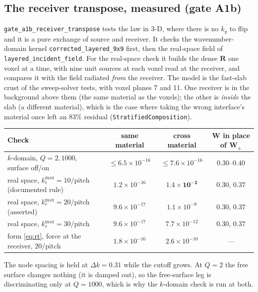 \documentclass[11pt,a4paper]{article}
\newcommand{\bW}{\mathbf{W}}
\newcommand{\bR}{\mathbf{R}}
\begin{document}
\subsection{The receiver transpose, measured (gate A1b)}\label{sec:a1b}

\nolinkurl{gate_a1b_receiver_transpose} tests the law in 3-D, where there is no $k_y$ to flip and
it is a pure exchange of source and receiver. It checks the wavenumber-domain kernel
\nolinkurl{corrected_layered_9x9} first, then the real-space field of
\nolinkurl{layered_incident_field}. For the real-space check it builds the dense $\bR$ one voxel at
a time, with nine unit sources at each voxel read at the receiver, and compares it with the field
radiated \emph{from} the receiver. The model is the fast-slab crust of the sweep-solver tests,
with voxel planes 7 and 11. One receiver is in the background above them (the same material as the
voxels); the other is \emph{inside} the slab (a different material), which is the case where
taking the wrong interface's material once left an 83\% residual (\texttt{StratifiedComposition}).

\begin{center}
\small
\setlength{\tabcolsep}{4pt}\begin{tabular}{@{}lccc@{}}
\toprule
Check & same material & cross material & $\bW$ in place of $\mathbf{W}_{\pm}$ \\
\midrule
$k$-domain, $Q=2, 1000$, surface off/on & $\le6.5\times10^{-16}$ & $\le7.6\times10^{-16}$ & $0.30$--$0.40$ \\
real space, $k_r^{\max}=10/\text{pitch}$ (documented rule) & $1.2\times10^{-16}$ & $\mathbf{1.4\times10^{-2}}$ & $0.30$, $0.37$ \\
real space, $k_r^{\max}=20/\text{pitch}$ (asserted) & $9.6\times10^{-17}$ & $1.1\times10^{-9}$ & $0.30$, $0.37$ \\
real space, $k_r^{\max}=30/\text{pitch}$ & $9.6\times10^{-17}$ & $7.7\times10^{-12}$ & $0.30$, $0.37$ \\
form \eqref{eq:rt}, force at the receiver, $20/\text{pitch}$ & $1.8\times10^{-16}$ & $2.6\times10^{-10}$ & --- \\
\bottomrule
\end{tabular}
\end{center}

The node spacing is held at $\Delta k = 0.31$ while the cutoff grows. At $Q=2$ the free surface
changes nothing (it is damped out), so the free-surface leg is discriminating only at $Q=1000$,
which is why the $k$-domain check is run at both.
\end{document}
